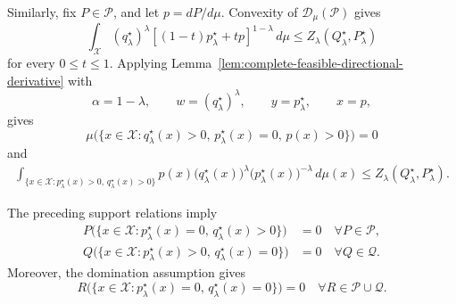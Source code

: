 \documentclass[journal,12pt,draftclsnofoot,onecolumn]{IEEEtran}
\begin{document}
\begin{IEEEproof}
Similarly, fix $P\in\mathcal P$, and let $p=dP/d\mu$. Convexity of
$\mathcal D_\mu(\mathcal P)$ gives
\begin{equation*}
\int_{\mathcal X}
(q_\lambda^\star)^\lambda
\left[
(1-t)p_\lambda^\star+tp
\right]^{1-\lambda}
\,d\mu
\leq
Z_\lambda(Q_\lambda^\star,P_\lambda^\star)
\end{equation*}
for every $0\leq t\leq1$. Applying
Lemma~\ref{lem:complete-feasible-directional-derivative} with
\begin{equation*}
\alpha=1-\lambda,
\qquad
w=(q_\lambda^\star)^\lambda,
\qquad
y=p_\lambda^\star,
\qquad
x=p,
\end{equation*}
gives
\begin{equation*}
\mu\bigl(
\{x\in\mathcal X:
q_\lambda^\star(x)>0,\,
p_\lambda^\star(x)=0,\,
p(x)>0\}
\bigr)
=
0
\end{equation*}
and
\begin{equation*}
\begin{aligned}
\int_{\{x\in\mathcal X:
p_\lambda^\star(x)>0,\,
q_\lambda^\star(x)>0\}}
p(x)
\bigl(q_\lambda^\star(x)\bigr)^\lambda
\bigl(p_\lambda^\star(x)\bigr)^{-\lambda}
\,d\mu(x)
\leq
Z_\lambda(Q_\lambda^\star,P_\lambda^\star).
\end{aligned}
\end{equation*}

The preceding support relations imply
\begin{equation*}
\begin{aligned}
P\bigl(
\{x\in\mathcal X:
p_\lambda^\star(x)=0,\,
q_\lambda^\star(x)>0\}
\bigr)
&=0
\quad \forall P\in\mathcal P,
\\
Q\bigl(
\{x\in\mathcal X:
p_\lambda^\star(x)>0,\,
q_\lambda^\star(x)=0\}
\bigr)
&=0
\quad \forall Q\in\mathcal Q.
\end{aligned}
\end{equation*}
Moreover, the domination assumption gives
\begin{equation*}
R\bigl(
\{x\in\mathcal X:
p_\lambda^\star(x)=0,\,
q_\lambda^\star(x)=0\}
\bigr)
=
0
\quad
\forall R\in\mathcal P\cup\mathcal Q.
\end{equation*}


\end{IEEEproof}
\end{document}
